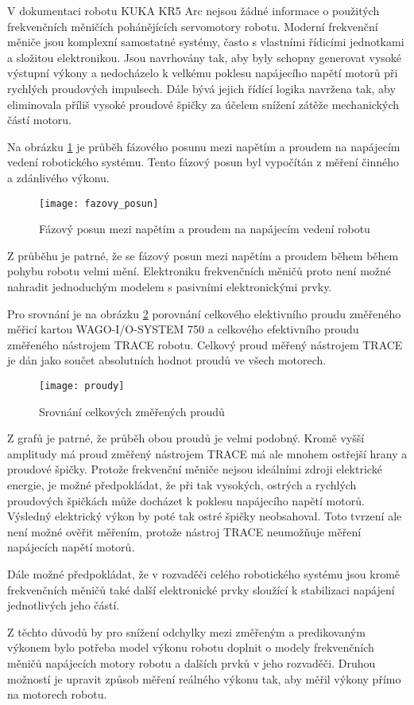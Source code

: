 V dokumentaci robotu KUKA KR5 Arc nejsou žádné informace o použitých frekvenčních měničích pohánějících servomotory robotu. Moderní frekvenční měniče jsou komplexní samostatné systémy, často s vlastními řídicími jednotkami a složitou elektronikou. Jsou navrhovány tak, aby byly schopny generovat vysoké výstupní výkony a nedocházelo k velkému poklesu napájecího napětí motorů při rychlých proudových impulsech. Dále bývá jejich řídící logika navržena tak, aby eliminovala příliš vysoké proudové špičky za účelem snížení zátěže mechanických částí motoru.

Na obrázku \ref{fazovy_posun_pic} je průběh fázového posunu mezi napětím a proudem na napájecím vedení robotického systému. Tento fázový posun byl vypočítán z měření činného a zdánlivého výkonu. 

\begin{figure}[h!]
\texttt{[image: fazovy\_posun]}
\caption{Fázový posun mezi napětím a proudem na napájecím vedení robotu}
\label{fazovy_posun_pic}
\end{figure}

Z průběhu je patrné, že se fázový posun mezi napětím a proudem během během pohybu robotu velmi mění. Elektroniku frekvenčních měničů proto není možné nahradit jednoduchým modelem s pasivními elektronickými prvky.  

Pro srovnání je na obrázku \ref{proudy_pic} porovnání celkového elektivního proudu změřeného měřicí kartou WAGO-I/O-SYSTEM 750 a celkového efektivního proudu změřeného nástrojem TRACE robotu. Celkový proud měřený nástrojem TRACE je dán jako součet absolutních hodnot proudů ve všech motorech.

\begin{figure}[h!]
\texttt{[image: proudy]}
\caption{Srovnání celkových změřených proudů}
\label{proudy_pic}
\end{figure}

Z grafů je patrné, že průběh obou proudů je velmi podobný. Kromě vyšší amplitudy má proud změřený nástrojem TRACE má ale mnohem ostřejší hrany a proudové špičky. Protože frekvenční měniče nejsou ideálními zdroji elektrické energie, je možné předpokládat, že při tak vysokých, ostrých a rychlých proudových špičkách může docházet k poklesu napájecího napětí motorů. Výsledný elektrický výkon by poté tak ostré špičky neobsahoval. Toto tvrzení ale není možné ověřit měřením, protože nástroj TRACE neumožňuje měření napájecích napětí motorů.

\newpage

Dále možné předpokládat, že v rozvaděči celého robotického systému jsou kromě frekvenčních měničů také další elektronické prvky sloužící k stabilizaci napájení jednotlivých jeho částí. 

Z těchto důvodů by pro snížení odchylky mezi změřeným a predikovaným výkonem bylo potřeba model výkonu robotu doplnit o modely frekvenčních měničů napájecích motory robotu a dalších prvků v jeho rozvaděči. Druhou možností je upravit způsob měření reálného výkonu tak, aby měřil výkony přímo na motorech robotu.